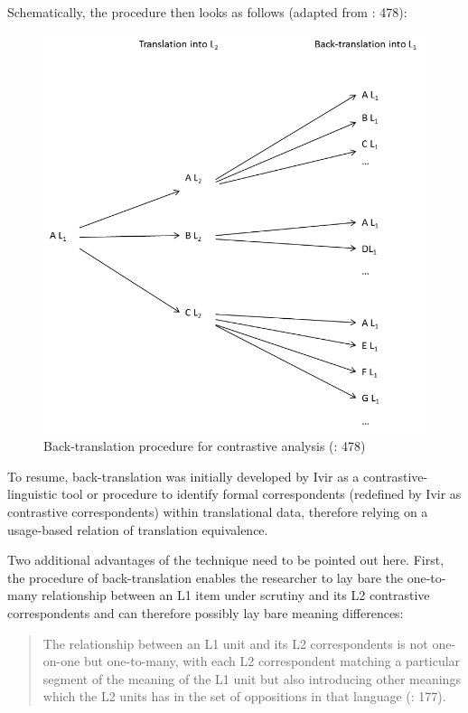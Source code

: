 Schematically, the procedure then looks as follows (adapted from \citealt{dirven_functionalism_1987}: 478):


\begin{figure}
\includegraphics[height=.3\textheight]{figures/Vandevoorde2-img1.png}
\caption{\label{fig:key:2}  Back-translation procedure for contrastive analysis (\citealt{dirven_functionalism_1987}: 478)
}

\end{figure}

To resume, back-translation was initially developed by Ivir as a contrastive-linguistic tool or procedure to identify formal correspondents (redefined by Ivir as contrastive correspondents) within translational data, therefore relying on a usage-based relation of translation equivalence.



Two additional advantages of the technique need to be pointed out here. First, the procedure of back-translation enables the researcher to lay bare the one-to-many relationship between an L1 item under scrutiny and its L2 contrastive correspondents and can therefore possibly lay bare meaning differences:


\begin{quote}
The relationship between an L1 unit and its L2 correspondents is not one-on-one but one-to-many, with each L2 correspondent matching a particular segment of the meaning of the L1 unit but also introducing other meanings which the L2 units has in the set of oppositions in that language (\citealt{ivir_translation-based_1983}: 177).
\end{quote}


